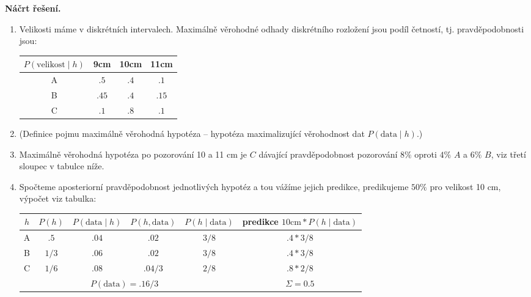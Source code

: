 \medskip
\noindent\textbf{Náčrt řešení.}\par
\begin{enumerate}[nosep]
  \item Velikosti máme v diskrétních intervalech. Maximálně věrohodné odhady diskrétního rozložení jsou podíl četností, tj. pravděpodobnosti jsou:
  \begin{center}
  \begin{tabular}{c|ccc}
  \toprule
  $P(\text{velikost} \mid h)$ & 9cm & 10cm & 11cm \\
  \midrule
  A & $.5$ & $.4$ & $.1$ \\
  B & $.45$ & $.4$ & $.15$ \\
  C & $.1$ & $.8$ & $.1$ \\
  \bottomrule
  \end{tabular}
  \end{center}
  \item (Definice pojmu maximálně věrohodná hypotéza -- hypotéza maximalizující věrohodnost dat $P(\text{data} \mid h)$.)
  \item Maximálně věrohodná hypotéza po pozorování 10 a 11 cm je $C$ dávající pravděpodobnost pozorování $8\%$ oproti $4\%$ $A$ a $6\%$ $B$, viz třetí sloupec v tabulce níže.
  \item Spočteme aposteriorní pravděpodobnost jednotlivých hypotéz a tou vážíme jejich predikce, predikujeme $50\%$ pro velikost 10 cm, výpočet viz tabulka:
  \begin{center}
  \begin{tabular}{c|c|c|c|c|c}
  \toprule
  $h$ & $P(h)$ & $P(\text{data} \mid h)$ & $P(h, \text{data})$ & $P(h \mid \text{data})$ & predikce $10\text{cm} * P(h \mid \text{data})$ \\
  \midrule
  A & $.5$   & $.04$ & $.02$   & $3/8$ & $.4 * 3/8$ \\
  B & $1/3$  & $.06$ & $.02$   & $3/8$ & $.4 * 3/8$ \\
  C & $1/6$  & $.08$ & $.04/3$ & $2/8$ & $.8 * 2/8$ \\
  \midrule
  & & \multicolumn{2}{c|}{$P(\text{data}) = .16/3$} & & $\Sigma = 0.5$ \\
  \bottomrule
  \end{tabular}
  \end{center}
\end{enumerate}

